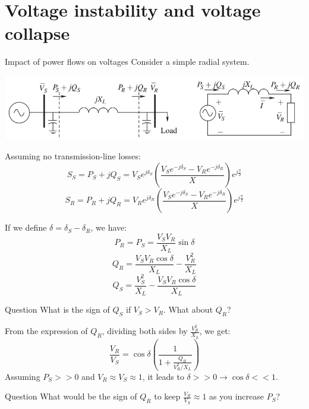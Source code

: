 \section{Voltage instability and voltage collapse}

\begin{frame}[allowframebreaks]{Impact of power flows on voltages}
Consider a simple radial system.

\begin{center}
\includegraphics[width=\textwidth]{images/RadialSystem.png}
\end{center}

Assuming no transmission-line losses:
$$S_S = P_S + jQ_S = V_S e^{j \delta_S} \left(\frac{V_S e^{-j \delta_S} - V_R e^{-j \delta_R}}{X}\right) e^{j\frac{\pi}{2}}$$
$$S_R = P_R + jQ_R = V_R e^{j \delta_R} \left(\frac{V_S e^{-j \delta_S} - V_R e^{-j \delta_R}}{X}\right) e^{j\frac{\pi}{2}}$$


If we define $\delta = \delta_S-\delta_R$, we have:
$$P_R = P_S = \frac{V_S V_R}{X_L}\sin \delta$$
$$Q_{R} = \frac{V_S V_R \cos \delta}{X_L} - \frac{V^2_R}{X_L}$$
$$Q_{S} = \frac{V_S^2}{X_L} - \frac{V_S V_R \cos \delta}{X_L}$$


\begin{block}{Question}
     What is the sign of $Q_S$ if $V_S>V_R$. What about $Q_R$?
\end{block}

From the expression of $Q_{R}$, dividing both sides by $\frac{V_R^2}{X_L}$, we get:
$$\frac{V_R}{V_S} = \cos \delta \left(\frac{1}{1+\frac{Q_R}{V^2_R/X_L}}\right)$$
Assuming $P_S>>0$ and $V_R \approx V_S \approx 1$, it leads to $\delta >> 0 \rightarrow \cos \delta << 1$.
\begin{block}{Question}
What would be the sign of $Q_R$ to keep $\frac{V_R}{V_S}\approx 1$ as you increase $P_S$?
\end{block}


\end{frame}
